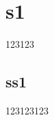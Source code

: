 \documentclass{article}
\begin{document}
\section{s1}

123123

\subsection{ss1}

123123123



\end{document}
